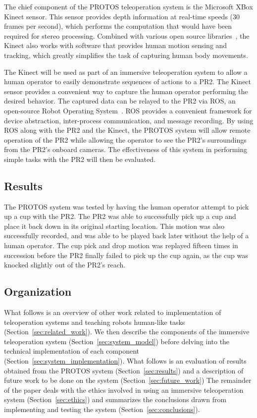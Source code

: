 \documentclass{sig-alternate}
\begin{document}
\indent The chief component of the PROTOS teleoperation system is the Microsoft XBox Kinect sensor. This sensor provides depth information at real-time speeds
(30 frames per second), which performs the computation that would have been required for stereo 
processing. Combined with various open source libraries~\cite{kinect}, the Kinect also works with 
software that provides human motion sensing and tracking, which greatly simplifies the task of capturing human body movements.

\indent The Kinect will be used as part of an immersive teleoperation system to allow a human operator to easily demonstrate sequences of actions
to a PR2.
The Kinect sensor provides a convenient way to capture the human operator performing the desired behavior. The captured data can be relayed to the
PR2 via ROS, an open-source Robot Operating System~\cite{ros}. ROS provides a 
convenient framework for device abstraction, inter-process communication, and message recording.
By using ROS along with the PR2 and the Kinect, the PROTOS system will allow remote operation of the PR2 while
allowing the operator to see the PR2's surroundings from the PR2's onboard cameras. The effectiveness of this system in performing simple tasks with the PR2 
will then be evaluated.

\subsection{Results}
\indent The PROTOS system was tested by having the human operator attempt to pick up a cup with the PR2. The PR2 was able to successfully pick up a cup and 
place it back down in its original starting location. This motion was also successfully recorded, and was able to be played back later without the help of a human operator.
The cup pick and drop motion was replayed fifteen times in succession before the PR2 finally failed to pick up the cup again, as the cup was knocked slightly out of
the PR2's reach.

\subsection{Organization}
\indent What follows is an overview of other work related to implementation of 
teleoperation systems and teaching robots human-like tasks (Section~\ref{sec:related_work}). We then describe 
the components of the immersive teleoperation system (Section~\ref{sec:system_model}) before delving 
into the technical implementation of each component (Section~\ref{sec:system_implementation}). What follows is an 
evaluation of results obtained from the PROTOS system (Section~\ref{sec:results}) and a description of future work to be
done on the system (Section~\ref{sec:future_work}) The remainder of the paper deals with the ethics involved in using an immersive teleoperation
system (Section~\ref{sec:ethics}) and summarizes the conclusions drawn from implementing and testing the system (Section~\ref{sec:conclusions}).
\end{document}
